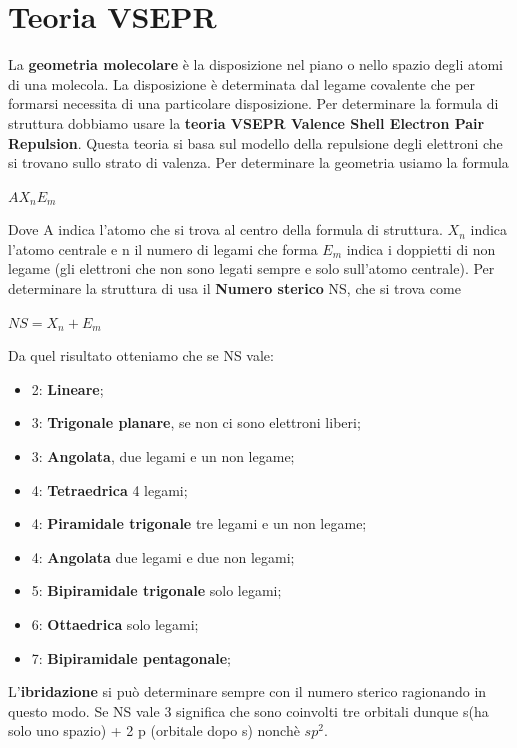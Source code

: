 \documentclass[11pt, a4paper, openright]{book}
\begin{document}
\section{Teoria VSEPR}
La \textbf{geometria molecolare} è la disposizione nel piano o nello spazio degli atomi di una molecola. 
La disposizione è determinata dal legame covalente che per formarsi necessita di una particolare disposizione.
Per determinare la formula di struttura dobbiamo usare la \textbf{teoria VSEPR Valence Shell Electron Pair Repulsion}.
Questa teoria si basa sul modello della repulsione degli elettroni che si trovano sullo strato di valenza. 
Per determinare la geometria usiamo la formula 
\begin{center}
    \textbf{ $AX_nE_m$}
\end{center}
Dove A indica l'atomo che si trova al centro della formula di struttura.
$X_n$ indica l'atomo centrale e n il numero di legami che forma
$E_m$ indica i doppietti di non legame (gli elettroni che non sono legati sempre e solo sull'atomo centrale).
Per determinare la struttura di usa il \textbf{Numero sterico} NS, che si trova come 
\begin{center}
    $NS = X_n + E_m$
\end{center}
Da quel risultato otteniamo che se NS vale: 
\begin{itemize}
    \item 2: \textbf{Lineare};
    \item 3: \textbf{Trigonale planare}, se non ci sono elettroni liberi;
    \item 3: \textbf{Angolata}, due legami e un non legame;
    \item 4: \textbf{Tetraedrica} 4 legami;
    \item 4: \textbf{Piramidale trigonale} tre legami e un non legame;
    \item 4: \textbf{Angolata} due legami e due non legami;
    \item 5: \textbf{Bipiramidale trigonale} solo legami;
    \item 6: \textbf{Ottaedrica} solo legami;
    \item 7: \textbf{Bipiramidale pentagonale};
\end{itemize}
L'\textbf{ibridazione} si può determinare sempre con il numero sterico ragionando in questo modo.
Se NS vale 3 significa che sono coinvolti tre orbitali dunque s(ha solo uno spazio) + 2 p (orbitale dopo s) nonchè $sp^2$.
\newpage
\end{document}
